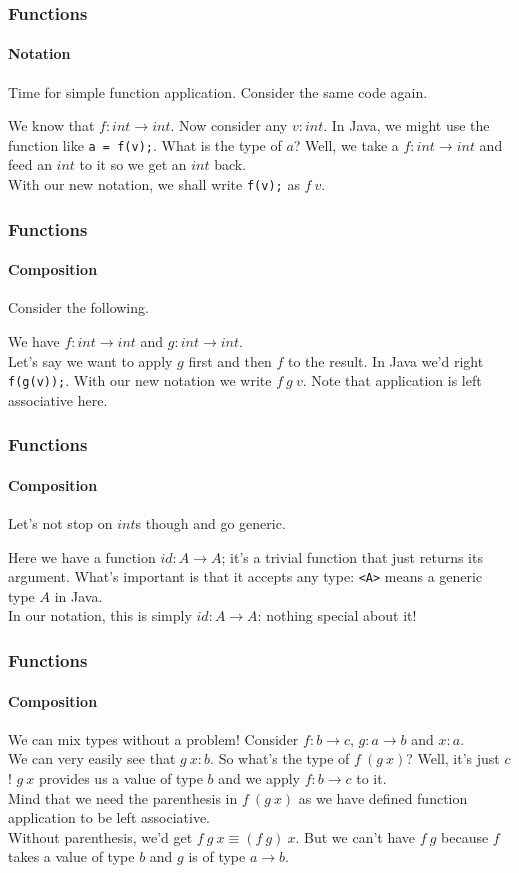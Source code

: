 \documentclass{beamer}
\begin{document}
\begin{frame}
  \frametitle{Functions}
  \framesubtitle{Notation}
  Time for simple function application. Consider the same code again.
  \pause
  
  \pause
  We know that $f:int \rightarrow int$. Now consider any $v:int$. In
  Java, we might use the function like \lstinline|a = f(v);|. What is
  the type of $a$? Well, we take a $f:int \rightarrow int$ and feed an
  $int$ to it so we get an $int$ back.\\
  \pause
  With our new notation, we shall write \lstinline|f(v);| as $f\:v$.\\

\end{frame}
\begin{frame}
  \frametitle{Functions}
  \framesubtitle{Composition}
  Consider the following.
  
  \pause
  We have $f:int \rightarrow int$ and $g:int \rightarrow int$.\\
  \pause
  Let's say we want to apply $g$ first and then $f$ to the result. In Java
  we'd right \lstinline|f(g(v));|. With our new notation we write
  $f\:g\:v$. Note that application is left associative here.\\
\end{frame}
\begin{frame}
  \frametitle{Functions}
  \framesubtitle{Composition}
  Let's not stop on $int$s though and go generic.
  
  \pause
  Here we have a function $id:A \rightarrow A$; it's a trivial
  function that just returns its argument. What's important is that
  it accepts any type: \lstinline|<A>| means a generic type $A$ in
  Java.\\
  \pause
  In our notation, this is simply $id:A \rightarrow A$: nothing
  special about it!
\end{frame}
\begin{frame}
  \frametitle{Functions}
  \framesubtitle{Composition}
  We can mix types without a problem! Consider $f:b \rightarrow c$, $g:a
  \rightarrow b$ and $x:a$.\\
  \pause
  We can very easily see that $g\:x:b$. So what's the type of
  $f\:(g\:x)$? Well, it's just $c$! $g\:x$ provides us a value of type
  $b$ and we apply $f:b \rightarrow c$ to it.\\
  \pause
  Mind that we need the parenthesis in $f\:(g\:x)$ as we have defined
  function application to be left associative.\\
  Without parenthesis, we'd get $f\:g\:x \equiv (f\:g)\:x$. But we
  can't have $f\:g$ because $f$ takes a value of type $b$ and $g$ is
  of type $a \rightarrow b$.\\
\end{frame}
\end{document}
